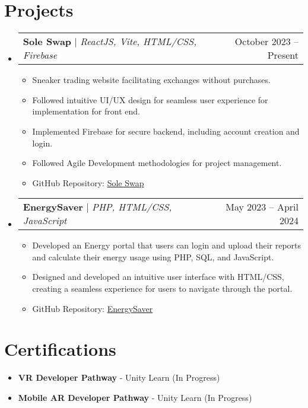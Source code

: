 \documentclass[letterpaper,11pt]{article}
\makeatletter
\newcommand{\resumeItem}[1]{
  \item\small{
    {#1 \vspace{-2pt}}
  }
}
\newcommand{\resumeProjectHeading}[2]{
    \item
    \begin{tabular*}{0.97\textwidth}{l@{\extracolsep{\fill}}r}
      \small#1 & #2 \\
    \end{tabular*}\vspace{-7pt}
}
\newcommand{\resumeSubHeadingListStart}{\begin{itemize}[leftmargin=0.15in, label={}]}
\newcommand{\resumeSubHeadingListEnd}{\end{itemize}}
\newcommand{\resumeItemListStart}{\begin{itemize}}
\newcommand{\resumeItemListEnd}{\end{itemize}\vspace{-5pt}}
\makeatother
\begin{document}
\section{Projects}
    \resumeSubHeadingListStart
      \resumeProjectHeading
          {\textbf{Sole Swap} $|$ \emph{ReactJS, Vite, HTML/CSS, Firebase}}{October 2023 -- Present}
          \resumeItemListStart
            \resumeItem{Sneaker trading website facilitating exchanges without purchases.}
            \resumeItem{Followed intuitive UI/UX design for seamless user experience for implementation for front end.}
            \resumeItem{Implemented Firebase for secure backend, including account creation and login.}
            \resumeItem{Followed Agile Development methodologies for project management.}
            \resumeItem{GitHub Repository: \href{https://github.com/ShaniaB417/Sole-Swap}{Sole Swap}}
          \resumeItemListEnd
      \resumeProjectHeading
          {\textbf{EnergySaver} $|$ \emph{PHP, HTML/CSS, JavaScript}}{May 2023 -- April 2024}
          \resumeItemListStart
            \resumeItem{Developed an Energy portal that users can login and upload their reports and calculate their energy usage using PHP, SQL, and JavaScript.}
            \resumeItem{Designed and developed an intuitive user interface with HTML/CSS, creating a seamless experience for users to navigate through the portal.}
            \resumeItem{GitHub Repository: \href{https://github.com/ShaniaB417/EnergySaver}{EnergySaver}}
          \resumeItemListEnd
    \resumeSubHeadingListEnd


\section{Certifications}
  \resumeSubHeadingListStart
    \item{\textbf{VR Developer Pathway  } - Unity Learn (In Progress)}
    \item{\textbf{ Mobile AR Developer Pathway } - Unity Learn (In Progress)}
  \resumeSubHeadingListEnd


%
\end{document}
